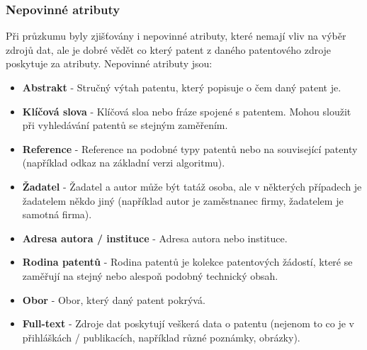 \subsubsection{Nepovinné atributy}
Při průzkumu byly zjišťovány i nepovinné atributy, které nemají vliv na výběr zdrojů dat, ale je dobré vědět co který patent z daného patentového zdroje poskytuje za atributy. Nepovinné atributy jsou:
\begin{itemize}
\item \textbf{Abstrakt} - Stručný výtah patentu, který popisuje o čem daný patent je.
\item \textbf{Klíčová slova} - Klíčová sloa nebo fráze spojené s patentem. Mohou sloužit při vyhledávání patentů se stejným zaměřením.
\item \textbf{Reference} - Reference na podobné typy patentů nebo na související patenty (například odkaz na základní verzi algoritmu).
\item \textbf{Žadatel} - Žadatel a autor může být tatáž osoba, ale v některých případech je žadatelem někdo jiný (například autor je zaměstnanec firmy, žadatelem je samotná firma).
\item \textbf{Adresa autora / instituce} - Adresa autora nebo instituce.
\item \textbf{Rodina patentů} - Rodina patentů je kolekce patentových žádostí, které se zaměřují na stejný nebo alespoň podobný technický obsah.
\item \textbf{Obor} - Obor, který daný patent pokrývá.
\item \textbf{Full-text} - Zdroje dat poskytují veškerá data o patentu (nejenom to co je v přihláškách / publikacích, například různé poznámky, obrázky).
\end{itemize}



